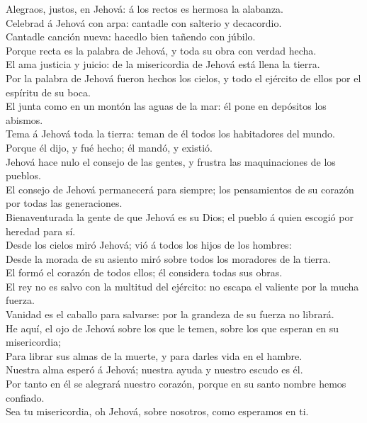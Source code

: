  Alegraos, justos, en Jehová: á los rectos es hermosa la
alabanza.\\
 Celebrad á Jehová con arpa: cantadle con salterio y
decacordio.\\
 Cantadle canción nueva: hacedlo bien tañendo con
júbilo.\\
 Porque recta es la palabra de Jehová, y toda su obra con
verdad hecha.\\
 El ama justicia y juicio: de la misericordia de Jehová
está llena la tierra.\\
 Por la palabra de Jehová fueron hechos los cielos, y todo
el ejército de ellos por el espíritu de su boca.\\
 El junta como en un montón las aguas de la mar: él pone
en depósitos los abismos.\\
 Tema á Jehová toda la tierra: teman de él todos los
habitadores del mundo.\\
 Porque él dijo, y fué hecho; él mandó, y existió.\\
 Jehová hace nulo el consejo de las gentes, y frustra las
maquinaciones de los pueblos.\\
 El consejo de Jehová permanecerá para siempre; los
pensamientos de su corazón por todas las generaciones.\\
 Bienaventurada la gente de que Jehová es su Dios; el
pueblo á quien escogió por heredad para sí.\\
 Desde los cielos miró Jehová; vió á todos los hijos de
los hombres:\\
 Desde la morada de su asiento miró sobre todos los
moradores de la tierra.\\
 El formó el corazón de todos ellos; él considera todas
sus obras.\\
 El rey no es salvo con la multitud del ejército: no
escapa el valiente por la mucha fuerza.\\
 Vanidad es el caballo para salvarse: por la grandeza de
su fuerza no librará.\\
 He aquí, el ojo de Jehová sobre los que le temen, sobre
los que esperan en su misericordia;\\
 Para librar sus almas de la muerte, y para darles vida
en el hambre.\\
 Nuestra alma esperó á Jehová; nuestra ayuda y nuestro
escudo es él.\\
 Por tanto en él se alegrará nuestro corazón, porque en
su santo nombre hemos confiado.\\
 Sea tu misericordia, oh Jehová, sobre nosotros, como
esperamos en ti.

